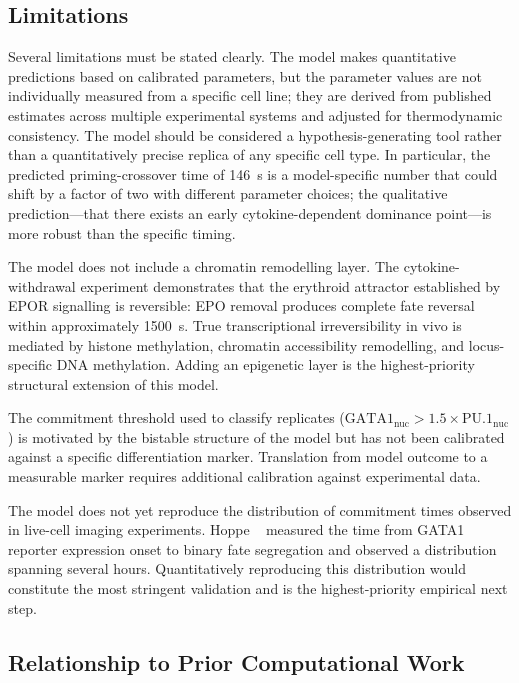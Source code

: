 \subsection{Limitations}

Several limitations must be stated clearly. The model makes quantitative
predictions based on calibrated parameters, but the parameter values are not
individually measured from a specific cell line; they are derived from published
estimates across multiple experimental systems and adjusted for thermodynamic
consistency. The model should be considered a hypothesis-generating tool rather
than a quantitatively precise replica of any specific cell type. In particular,
the predicted priming-crossover time of 146~s is a model-specific number that
could shift by a factor of two with different parameter choices; the qualitative
prediction---that there exists an early cytokine-dependent dominance point---is
more robust than the specific timing.

The model does not include a chromatin remodelling layer. The cytokine-withdrawal
experiment demonstrates that the erythroid attractor established by EPOR
signalling is reversible: EPO removal produces complete fate reversal within
approximately 1500~s. True transcriptional irreversibility in vivo is mediated by
histone methylation, chromatin accessibility remodelling, and locus-specific DNA
methylation. Adding an epigenetic layer is the highest-priority structural
extension of this model.

The commitment threshold used to classify replicates
($\text{GATA1}_\text{nuc} > 1.5 \times \text{PU.1}_\text{nuc}$) is motivated by the bistable
structure of the model but has not been calibrated against a specific
differentiation marker. Translation from model outcome to a measurable marker
requires additional calibration against experimental data.

The model does not yet reproduce the distribution of commitment times observed in
live-cell imaging experiments. Hoppe \etal~\cite{hoppe2016} measured the time from
GATA1 reporter expression onset to binary fate segregation and observed a
distribution spanning several hours. Quantitatively reproducing this distribution
would constitute the most stringent validation and is the highest-priority
empirical next step.

\subsection{Relationship to Prior Computational Work}

